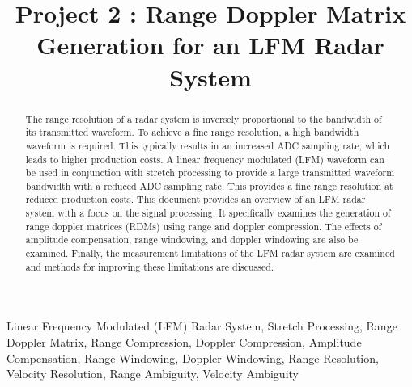 \documentclass[conference]{IEEEtran}
\begin{document}
\title{Project 2 : Range Doppler Matrix Generation for an LFM Radar System}

\author{
}
\maketitle

\begin{abstract}
The range resolution of a radar system is inversely proportional to the bandwidth of its transmitted waveform. To achieve a fine range resolution, a high bandwidth waveform is required. This typically results in an increased ADC sampling rate, which leads to higher production costs. A linear frequency modulated (LFM) waveform can be used in conjunction with stretch processing to provide a large transmitted waveform bandwidth with a reduced ADC sampling rate. This provides a fine range resolution at reduced production costs. This document provides an overview of an LFM radar system with a focus on the signal processing. It specifically examines the generation of range doppler matrices (RDMs) using range and doppler compression. The effects of amplitude compensation, range windowing, and doppler windowing are also be examined. Finally, the measurement limitations of the LFM radar system are examined and methods for improving these limitations are discussed. 
\end{abstract}

\begin{IEEEkeywords}
Linear Frequency Modulated (LFM) Radar System, Stretch Processing, Range Doppler Matrix, Range Compression, Doppler Compression, Amplitude Compensation, Range Windowing, Doppler Windowing, Range Resolution, Velocity Resolution, Range Ambiguity, Velocity Ambiguity
\end{IEEEkeywords}
\end{document}
